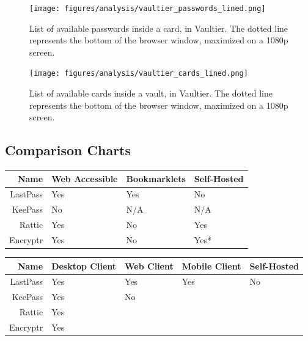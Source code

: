 			\begin{figure}[htbp]
				\centering
				\texttt{[image: figures/analysis/vaultier\_passwords\_lined.png]}
				\caption{List of available passwords inside a card, in Vaultier. The dotted line represents the bottom of the browser window, maximized on a 1080p screen.}
				\label{fig:vaultier_passwords}
			\end{figure}
			\begin{figure}[htbp]
				\centering
				\texttt{[image: figures/analysis/vaultier\_cards\_lined.png]}
				\caption{List of available cards inside a vault, in Vaultier. The dotted line represents the bottom of the browser window, maximized on a 1080p screen.}
				\label{fig:vaultier_cards}
			\end{figure}





		\subsection*{Comparison Charts}


			\begin{tabular} {r l l l }
				Name 				& Web Accessible 	& Bookmarklets	& Self-Hosted 		\\
				\hline
				LastPass 			& \cellcolor{green!75}Yes	& \cellcolor{green!75}Yes	& \cellcolor{red!75} No		\\
				KeePass 			& \cellcolor{red!75}No 		& N/A 						& N/A						\\ 
				Rattic  			& \cellcolor{green!75}Yes 	& \cellcolor{red!75}No 		& \cellcolor{green!75} Yes	\\
				Encryptr 			& \cellcolor{green!75}Yes 	& \cellcolor{red!75}No 		& \cellcolor{green!75} Yes* \\
			\end{tabular}


			\begin{tabular}{ r l l l l }
					Name 				& Desktop Client 	& Web Client 	& Mobile Client 	& Self-Hosted	\\
					\hline
					LastPass 			& Yes 				& Yes			& Yes				& No \\
					KeePass 			& Yes				& No			& \\
					Rattic  			& Yes						& \\
					Encryptr 			& Yes					  	& \\
				\end{tabular}



